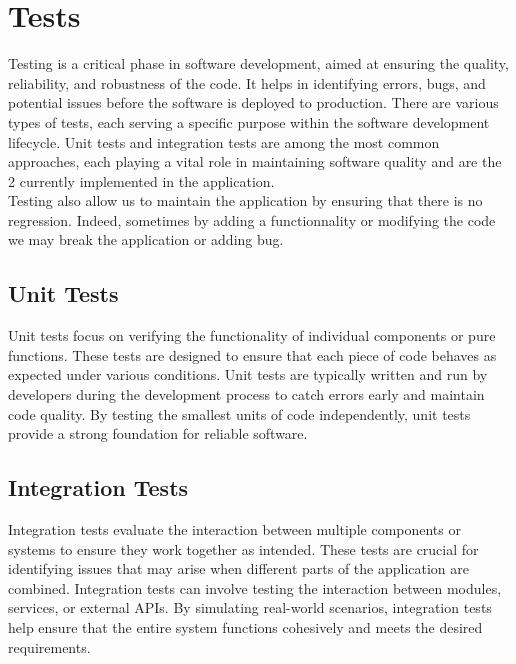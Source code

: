 \section{Tests}

Testing is a critical phase in software development, aimed at ensuring the quality, reliability, and robustness of the code. It helps in identifying errors, bugs, and potential issues before the software is deployed to production. There are various types of tests, each serving a specific purpose within the software development lifecycle. Unit tests and integration tests are among the most common approaches, each playing a vital role in maintaining software quality and are the 2 currently implemented in the application.\\
Testing also allow us to maintain the application by ensuring that there is no regression. Indeed, sometimes by adding a functionnality or modifying the code we may break the application or adding bug.


\subsection{Unit Tests}
Unit tests focus on verifying the functionality of individual components or pure functions. These tests are designed to ensure that each piece of code behaves as expected under various conditions. Unit tests are typically written and run by developers during the development process to catch errors early and maintain code quality. By testing the smallest units of code independently, unit tests provide a strong foundation for reliable software.

\subsection{Integration Tests}
Integration tests evaluate the interaction between multiple components or systems to ensure they work together as intended. These tests are crucial for identifying issues that may arise when different parts of the application are combined. Integration tests can involve testing the interaction between modules, services, or external APIs. By simulating real-world scenarios, integration tests help ensure that the entire system functions cohesively and meets the desired requirements.
